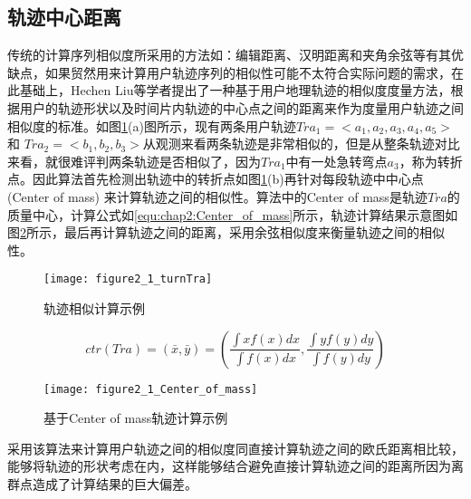 \subsection{轨迹中心距离}
传统的计算序列相似度所采用的方法如：编辑距离、汉明距离和夹角余弦等有其优缺点，如果贸然用来计算用户轨迹序列的相似性可能不太符合实际问题的需求，在此基础上，Hechen Liu等学者提出了一种基于用户地理轨迹的相似度度量方法，根据用户的轨迹形状以及时间片内轨迹的中心点之间的距离来作为度量用户轨迹之间相似度的标准。如图\ref{fig:2_3_turn}(a)图所示，现有两条用户轨迹$Tra_{1}=<a_{1},a_{2},a_{3},a_{4},a_{5}>$和
$Tra_{2}=<b_{1},b_{2},b_{3}>$从观测来看两条轨迹是非常相似的，但是从整条轨迹对比来看，就很难评判两条轨迹是否相似了，因为$Tra_{1}$中有一处急转弯点$a_{3}$，称为转折点。因此算法首先检测出轨迹中的转折点如图\ref{fig:2_3_turn}(b)再针对每段轨迹中中心点(Center of mass) 来计算轨迹之间的相似性。算法中的Center of mass是轨迹$Tra$的质量中心，计算公式如\ref{equ:chap2:Center_of_mass}所示，轨迹计算结果示意图如图\ref{fig:2_3_Center_of_mass}所示，最后再计算轨迹之间的距离，采用余弦相似度来衡量轨迹之间的相似性。
\begin{figure}[htp]
\centering
\texttt{[image: figure2\_1\_turnTra]}
\caption{轨迹相似计算示例}
\label{fig:2_3_turn}
\end{figure}
\begin{equation}
\label{equ:chap2:Center_of_mass}
ctr(Tra)=(\bar{x},\bar{y})=(  \frac{\int x f(x)dx  }{\int f(x)dx},\frac{\int y f(y)dy  }{\int f(y)dy} )
\end{equation}
\begin{figure}[htp]
\centering
\texttt{[image: figure2\_1\_Center\_of\_mass]}
\caption{基于Center of mass轨迹计算示例}
\label{fig:2_3_Center_of_mass}
\end{figure}
\par 采用该算法来计算用户轨迹之间的相似度同直接计算轨迹之间的欧氏距离相比较，能够将轨迹的形状考虑在内，这样能够结合避免直接计算轨迹之间的距离所因为离群点造成了计算结果的巨大偏差。

